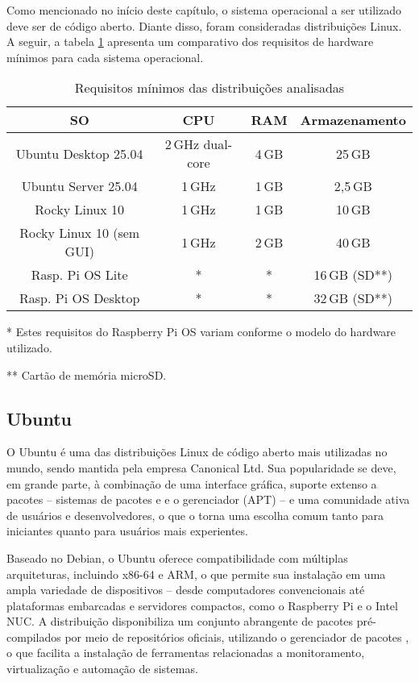Como mencionado no início deste capítulo, o sistema operacional a ser utilizado deve ser de código aberto. Diante disso, 
foram consideradas distribuições Linux. A seguir, a tabela \ref{tab:requisitos-minimos} apresenta um comparativo dos requisitos de hardware mínimos para cada sistema operacional.

\begin{table}[H]
\centering
\caption{Requisitos mínimos das distribuições analisadas}
\label{tab:requisitos-minimos}
\begin{tabular}{@{}c c c c@{}}
\toprule
\textbf{SO} & \textbf{CPU} & \textbf{RAM} & \textbf{Armazenamento} \\
\midrule
Ubuntu Desktop 25.04 & 2\,GHz dual-core & 4\,GB & 25\,GB \\
Ubuntu Server 25.04 & 1\,GHz & 1\,GB & 2{,}5\,GB \\
Rocky Linux 10 & 1\,GHz & 1\,GB & 10\,GB \\
Rocky Linux 10 (sem GUI) & 1\,GHz & 2\,GB & 40\,GB \\
Rasp. Pi OS Lite & * & * & 16\,GB (SD**) \\
Rasp. Pi OS Desktop & * & * & 32\,GB (SD**) \\
\bottomrule
\end{tabular}
\begin{flushleft}
\footnotesize

* Estes requisitos do Raspberry Pi OS variam conforme o modelo do hardware utilizado.

** Cartão de memória microSD.
\end{flushleft}
\end{table}

\subsection{Ubuntu}
\label{subsection:Ubuntu}

O Ubuntu \citep{ubuntudsktp2025} é uma das distribuições Linux de código aberto mais utilizadas no mundo, sendo mantida pela empresa Canonical Ltd. Sua popularidade se deve, em grande parte, à combinação de uma interface gráfica, suporte extenso a pacotes -- sistemas de pacotes  e  e o gerenciador  (APT) --  e uma comunidade ativa de usuários e desenvolvedores, o que o torna uma escolha comum tanto para iniciantes quanto para usuários mais experientes.

Baseado no Debian, o Ubuntu oferece compatibilidade com múltiplas arquiteturas, incluindo x86-64 e ARM, o que permite sua instalação em uma ampla variedade de dispositivos -- desde computadores convencionais até plataformas embarcadas e servidores compactos, como o Raspberry Pi e o Intel NUC. A distribuição disponibiliza um conjunto abrangente de pacotes pré-compilados por meio de repositórios oficiais, utilizando o gerenciador de pacotes , o que facilita a instalação de ferramentas relacionadas a monitoramento, virtualização e automação de sistemas.

